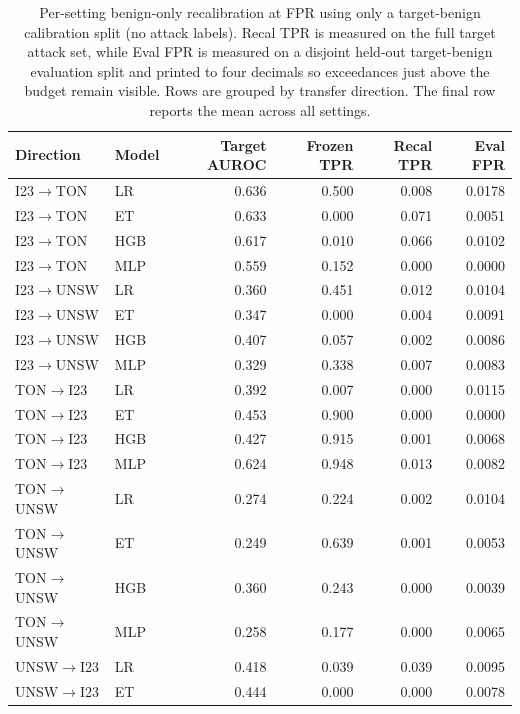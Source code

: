 \begin{table}[!htbp]
\centering
\scriptsize
\setlength{\tabcolsep}{3.5pt}
\caption{Per-setting benign-only recalibration at \FrozenFprTarget{} FPR using only a target-benign calibration split (no attack labels). Recal TPR is measured on the full target attack set, while Eval FPR is measured on a disjoint held-out target-benign evaluation split and printed to four decimals so exceedances just above the \FrozenFprTarget{} budget remain visible. Rows are grouped by transfer direction. The final row reports the mean across all \NaturalSettingCount{} settings.}
\label{tab:acsac-recalibration}
\begin{tabular}{llrrrr}
\toprule
Direction & Model & Target AUROC & Frozen TPR & Recal TPR & Eval FPR \\
\midrule
I23$\to$TON & LR & 0.636 & 0.500 & 0.008 & 0.0178 \\
I23$\to$TON & ET & 0.633 & 0.000 & 0.071 & 0.0051 \\
I23$\to$TON & HGB & 0.617 & 0.010 & 0.066 & 0.0102 \\
I23$\to$TON & MLP & 0.559 & 0.152 & 0.000 & 0.0000 \\
\midrule
I23$\to$UNSW & LR & 0.360 & 0.451 & 0.012 & 0.0104 \\
I23$\to$UNSW & ET & 0.347 & 0.000 & 0.004 & 0.0091 \\
I23$\to$UNSW & HGB & 0.407 & 0.057 & 0.002 & 0.0086 \\
I23$\to$UNSW & MLP & 0.329 & 0.338 & 0.007 & 0.0083 \\
\midrule
TON$\to$I23 & LR & 0.392 & 0.007 & 0.000 & 0.0115 \\
TON$\to$I23 & ET & 0.453 & 0.900 & 0.000 & 0.0000 \\
TON$\to$I23 & HGB & 0.427 & 0.915 & 0.001 & 0.0068 \\
TON$\to$I23 & MLP & 0.624 & 0.948 & 0.013 & 0.0082 \\
\midrule
TON$\to$UNSW & LR & 0.274 & 0.224 & 0.002 & 0.0104 \\
TON$\to$UNSW & ET & 0.249 & 0.639 & 0.001 & 0.0053 \\
TON$\to$UNSW & HGB & 0.360 & 0.243 & 0.000 & 0.0039 \\
TON$\to$UNSW & MLP & 0.258 & 0.177 & 0.000 & 0.0065 \\
\midrule
UNSW$\to$I23 & LR & 0.418 & 0.039 & 0.039 & 0.0095 \\
UNSW$\to$I23 & ET & 0.444 & 0.000 & 0.000 & 0.0078 \\

\end{tabular}
\end{table}
